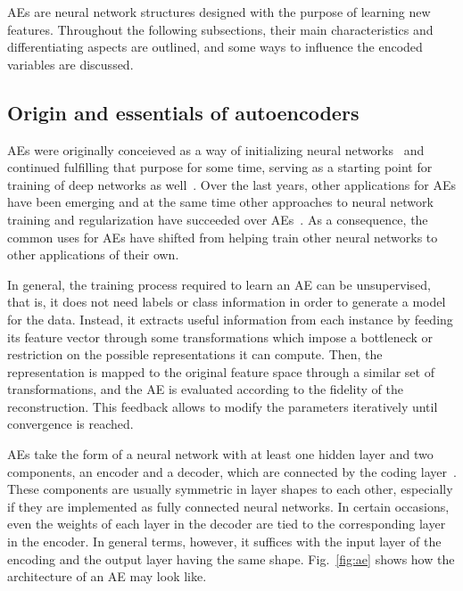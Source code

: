 AEs are neural network structures designed with the purpose of learning new features. Throughout the following subsections, their main characteristics and differentiating aspects are outlined, and some ways to influence the encoded variables are discussed.

\subsection{Origin and essentials of autoencoders}

AEs were originally conceieved as a way of initializing neural networks~ and continued fulfilling that purpose for some time, serving as a starting point for training of deep networks as well~. Over the last years, other applications for AEs have been emerging and at the same time other approaches to neural network training and regularization have succeeded over AEs~. As a consequence,  the common uses for AEs have shifted from helping train other neural networks to other applications of their own.

In general, the training process required to learn an AE can be unsupervised, that is, it does not need labels or class information in order to generate a model for the data. Instead, it extracts useful information from each instance by feeding its feature vector through some transformations which impose a bottleneck or restriction on the possible representations it can compute. Then, the representation is mapped to the original feature space through a similar set of transformations, and the AE is evaluated according to the fidelity of the reconstruction. This feedback allows to modify the parameters iteratively until convergence is reached.

AEs take the form of a neural network with at least one hidden layer and two components, an encoder and a decoder, which are connected by the coding layer~. These components are usually symmetric in layer shapes to each other, especially if they are implemented as fully connected neural networks. In certain occasions, even the weights of each layer in the decoder are tied to the corresponding layer in the encoder. In general terms, however, it suffices with the input layer of the encoding and the output layer having the same shape. Fig.~\ref{fig:ae} shows how the architecture of an AE may look like.

